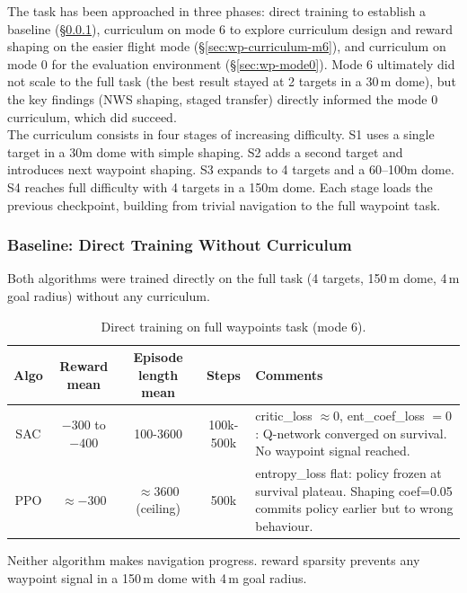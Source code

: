 \documentclass[11pt,a4paper]{article}
\begin{document}
The task has been approached in three phases: direct training to establish a baseline (\S\ref{sec:wp-baseline}), curriculum on mode 6 to explore curriculum design and reward shaping on the easier flight mode (\S\ref{sec:wp-curriculum-m6}), and curriculum on mode 0 for the evaluation environment (\S\ref{sec:wp-mode0}). Mode 6 ultimately did not scale to the full task (the best result stayed at 2 targets in a 30\,m dome), but the key findings (NWS shaping, staged transfer) directly informed the mode 0 curriculum, which did succeed. \\

The curriculum consists in four stages of increasing difficulty. S1 uses a single target in a 30m dome with simple shaping. S2 adds a second target and introduces next waypoint shaping. S3 expands to 4 targets and a 60–100m dome. S4 reaches full difficulty with 4 targets in a 150m dome. Each stage loads the previous checkpoint, building from trivial navigation to the full waypoint task.

\subsubsection{Baseline: Direct Training Without Curriculum}
\label{sec:wp-baseline}

Both algorithms were trained directly on the full task (4 targets, 150\,m dome, 4\,m goal radius) without any curriculum.

\begin{table}[H]
\centering
\small
\renewcommand{\arraystretch}{1.35}
\begin{tabular}{@{} c c c c >{\centering\arraybackslash}p{5.8cm} @{}}
\toprule
\textbf{Algo} & \textbf{Reward mean} & \textbf{Episode length mean} & \textbf{Steps} & \textbf{Comments} \\
\midrule
SAC & $-300$ to $-400$ & 100-3600 & 100k-500k &
  critic\_loss $\approx 0$, ent\_coef\_loss $= 0$: Q-network converged on survival. No waypoint signal reached. \\
PPO & $\approx -300$ & $\approx 3600$ (ceiling) & 500k &
  entropy\_loss flat: policy frozen at survival plateau. Shaping coef=0.05 commits policy earlier but to wrong behaviour. \\
\bottomrule
\end{tabular}
\caption{Direct training on full waypoints task (mode 6).}
\label{tab:wp-baseline}
\end{table}

Neither algorithm makes navigation progress. reward sparsity prevents any waypoint signal in a 150\,m dome with 4\,m goal radius.
\end{document}
